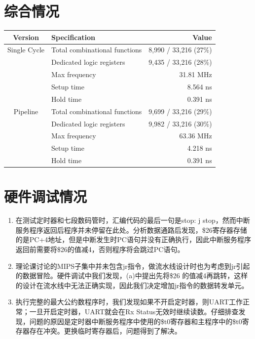 \documentclass{article}
\begin{document}
    \section{综合情况}
        \begin{table}[H]
            \centering
            \begin{tabular}{c|lr}
              \toprule
              Version & Specification & Value \\
              \midrule
              Single Cycle  & Total combinational functions & 8,990 / 33,216 (27\%) \\
                            & Dedicated logic registers & 9,435 / 33,216 (28\%) \\
                            & Max frequency & 31.81 MHz \\
                            & Setup time & 8.564 ns \\
                            & Hold time & 0.391 ns \\
              \midrule
              Pipeline  & Total combinational functions & 9,699 / 33,216 (29\%) \\
                        & Dedicated logic registers & 9,982 / 33,216 (30\%) \\
                        & Max frequency & 63.36 MHz \\
                        & Setup time & 4.218 ns \\
                        & Hold time & 0.391 ns \\
              \bottomrule
            \end{tabular}
        \end{table}


    \section{硬件调试情况}
        \begin{enumerate}
          \item 在测试定时器和七段数码管时，汇编代码的最后一句是stop: j stop，然而中断服务程序返回后程序并未停留在此处。分析数据通路后发现，\$26寄存器存储的是PC+4地址，但是中断发生时PC语句并没有正确执行，因此中断服务程序返回前需要将\$26的值减4，否则程序将会跳过PC语句。
          \item 理论课讨论的MIPS子集中并未包含jr指令，做流水线设计时也为考虑到jr引起的数据冒险。硬件调试中我们发现，(a)中提出先将\$26 的值减4再跳转，这样的设计在流水线中无法正确实现，因此我们决定增加jr指令的数据转发单元。
          \item 执行完整的最大公约数程序时，我们发现如果不开启定时器，则UART工作正常；一旦开启定时器，UART就会在Rx Status无效时继续读数。仔细排查发现，问题的原因是定时器中断服务程序中使用的\$t0寄存器和主程序中的\$t0寄存器存在冲突。更换临时寄存器后，问题得到了解决。
        \end{enumerate}
\end{document}
